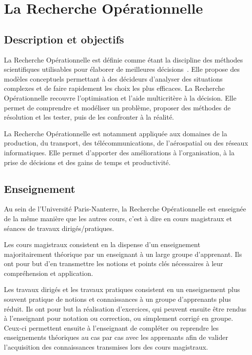 \section{La Recherche Opérationnelle}
\subsection{Description et objectifs}
La Recherche Opérationnelle est définie comme étant la discipline des méthodes scientifiques utilisables pour élaborer de meilleures décisions~\cite{gamif-def}. Elle propose des modèles conceptuels permettant à des décideurs d'analyser des situations complexes et de faire rapidement les choix les plus efficaces. La Recherche Opérationnelle recouvre l'optimisation et l'aide multicritère à la décision. Elle permet de comprendre et modéliser un problème, proposer des méthodes de résolution et les tester, puis de les confronter à la réalité.\par
La Recherche Opérationnelle est notamment appliquée aux domaines de la production, du transport, des télécommunications, de l'aérospatial ou des réseaux informatiques. Elle permet d'apporter des améliorations à l'organisation, à la prise de décisions et des gains de temps et productivité.

\subsection{Enseignement}
Au sein de l'Université Paris-Nanterre, la Recherche Opérationnelle est enseignée de la même manière que les autres cours, c'est à dire en cours magistraux et séances de travaux dirigés/pratiques.\par
Les cours magistraux consistent en la dispense d’un enseignement majoritairement théorique par un enseignant à un large groupe d’apprenant. Ils ont pour but d'en transmettre les notions et points clés nécessaires à leur compréhension et application.\par
Les travaux dirigés et les travaux pratiques consistent en un enseignement plus souvent pratique de notions et connaissances à un groupe d’apprenants plus réduit. Ils ont pour but la réalisation d’exercices, qui peuvent ensuite être rendus à l'enseignant pour notation ou correction, ou simplement corrigé en groupe. Ceux-ci permettent ensuite à l’enseignant de compléter ou reprendre les enseignements théoriques au cas par cas avec les apprenants afin de valider l’acquisition des connaissances transmises lors des cours magistraux. 

